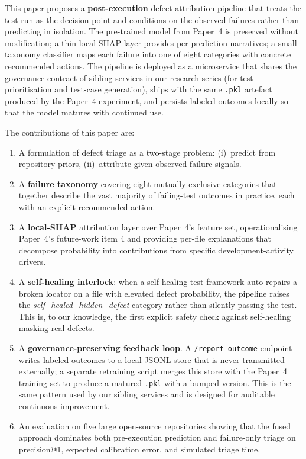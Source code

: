 \documentclass[conference]{IEEEtran}
\begin{document}
This paper proposes a \textbf{post-execution} defect-attribution pipeline that treats the test run as the decision point and conditions on the observed failures rather than predicting in isolation. The pre-trained model from Paper~4 is preserved without modification; a thin local-SHAP layer provides per-prediction narratives; a small taxonomy classifier maps each failure into one of eight categories with concrete recommended actions. The pipeline is deployed as a microservice that shares the governance contract of sibling services in our research series (for test prioritisation and test-case generation), ships with the same \texttt{.pkl} artefact produced by the Paper~4 experiment, and persists labeled outcomes locally so that the model matures with continued use.

The contributions of this paper are:
\begin{enumerate}
    \item A formulation of defect triage as a two-stage problem: (i)~predict from repository priors, (ii)~attribute given observed failure signals.
    \item A \textbf{failure taxonomy} covering eight mutually exclusive categories that together describe the vast majority of failing-test outcomes in practice, each with an explicit recommended action.
    \item A \textbf{local-SHAP} attribution layer over Paper~4's feature set, operationalising Paper~4's future-work item 4 and providing per-file explanations that decompose probability into contributions from specific development-activity drivers.
    \item A \textbf{self-healing interlock}: when a self-healing test framework auto-repairs a broken locator on a file with elevated defect probability, the pipeline raises the \textit{self\_healed\_hidden\_defect} category rather than silently passing the test. This is, to our knowledge, the first explicit safety check against self-healing masking real defects.
    \item A \textbf{governance-preserving feedback loop}. A \texttt{/report-outcome} endpoint writes labeled outcomes to a local JSONL store that is never transmitted externally; a separate retraining script merges this store with the Paper~4 training set to produce a matured \texttt{.pkl} with a bumped version. This is the same pattern used by our sibling services and is designed for auditable continuous improvement.
    \item An evaluation on five large open-source repositories showing that the fused approach dominates both pre-execution prediction and failure-only triage on precision@1, expected calibration error, and simulated triage time.
\end{enumerate}
\end{document}
